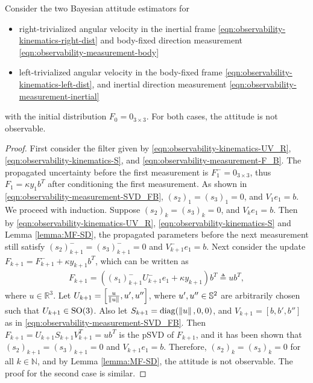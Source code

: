 \begin{theorem} \label{thm:observability-nonobs}
	Consider the two Bayesian attitude estimators for
	\begin{itemize}
		\item right-trivialized angular velocity in the inertial frame \eqref{eqn:observability-kinematics-right-dist} and body-fixed direction measurement \eqref{eqn:observability-measurement-body}  
		\item left-trivialized angular velocity in the body-fixed frame \eqref{eqn:observability-kinematics-left-dist}, and inertial direction measurement \eqref{eqn:observability-measurement-inertial} 
	\end{itemize}
	with the initial distribution $F_0=0_{3\times 3}$.
	For both cases, the attitude is not observable.
\end{theorem}
\begin{proof}
	First consider the filter given by \eqref{eqn:observability-kinematics-UV_R}, \eqref{eqn:observability-kinematics-S}, and \eqref{eqn:observability-measurement-F_B}.
	The propagated uncertainty before the first measurement is $F_1^- = 0_{3\times 3}$, thus $F_1 = \kappa y_1b^T$ after conditioning the first measurement.
	As shown in \eqref{eqn:observability-measurement-SVD_FB}, $(s_2)_1=(s_3)_1=0$, and $V_1e_1 = b$.
	We proceed with induction.
	Suppose $(s_2)_k=(s_3)_k=0$, and $V_ke_1 = b$.
	Then by \eqref{eqn:observability-kinematics-UV_R}, \eqref{eqn:observability-kinematics-S} and Lemma \ref{lemma:MF-SD}, the propagated parameters before the next measurement still satisfy $(s_2)_{k+1}^-=(s_3)_{k+1}^- = 0$ and $V_{k+1}^-e_1=b$.
	Next consider the update $F_{k+1} = F_{k+1}^-+\kappa y_{k+1}b^T$, which can be written as
	\begin{align*}
		F_{k+1} = \left((s_1)_{k+1}^-U_{k+1}^-e_1 + \kappa y_{k+1}\right)b^T \triangleq ub^T,
	\end{align*}
	where $u\in\mathbb{R}^3$.
	Let $U_{k+1} = \Big[ \frac{u}{\left\| u \right\|}, u', u'' \Big]$, where $u',u''\in\mathbb{S}^2$ are arbitrarily chosen such that $U_{k+1}\in\mathrm{SO}(3)$.
	Also let $S_{k+1} = \mathrm{diag}(\left\| u \right\|,0,0)$, and $V_{k+1} = [ b, b', b'' ]$ as in \eqref{eqn:observability-measurement-SVD_FB}.
	Then $F_{k+1} = U_{k+1}S_{k+1}V_{k+1}^T = ub^T $ is the pSVD of $F_{k+1}$, and it has been shown that $(s_2)_{k+1}=(s_3)_{k+1}=0$ and $V_{k+1}e_1=b$.
	Therefore, $(s_2)_k=(s_3)_k=0$ for all $k\in\mathbb{N}$, and by Lemma \ref{lemma:MF-SD}, the attitude is not observable.
	The proof for the second case is similar.
\end{proof}

